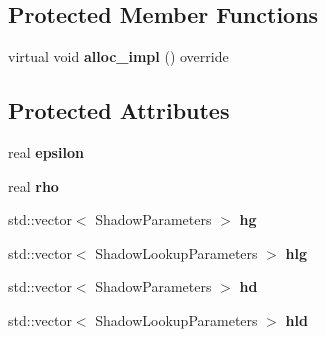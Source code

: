 \subsection*{Protected Member Functions}
\begin{DoxyCompactItemize}
\item 
\hypertarget{structdynet_1_1AdadeltaTrainer_a98d5d3abe044d455df1a0fb3c35fbf44}{}virtual void {\bfseries alloc\+\_\+impl} () override\label{structdynet_1_1AdadeltaTrainer_a98d5d3abe044d455df1a0fb3c35fbf44}

\end{DoxyCompactItemize}
\subsection*{Protected Attributes}
\begin{DoxyCompactItemize}
\item 
\hypertarget{structdynet_1_1AdadeltaTrainer_a65675903e5b9d77c7adde456d85d7b8c}{}real {\bfseries epsilon}\label{structdynet_1_1AdadeltaTrainer_a65675903e5b9d77c7adde456d85d7b8c}

\item 
\hypertarget{structdynet_1_1AdadeltaTrainer_a41208d6c68aa6478a661aac929b335e6}{}real {\bfseries rho}\label{structdynet_1_1AdadeltaTrainer_a41208d6c68aa6478a661aac929b335e6}

\item 
\hypertarget{structdynet_1_1AdadeltaTrainer_a51fb513277530881e6cbe16222adfff8}{}std\+::vector$<$ Shadow\+Parameters $>$ {\bfseries hg}\label{structdynet_1_1AdadeltaTrainer_a51fb513277530881e6cbe16222adfff8}

\item 
\hypertarget{structdynet_1_1AdadeltaTrainer_a3150eb1db93079ca53e470265c0a81df}{}std\+::vector$<$ Shadow\+Lookup\+Parameters $>$ {\bfseries hlg}\label{structdynet_1_1AdadeltaTrainer_a3150eb1db93079ca53e470265c0a81df}

\item 
\hypertarget{structdynet_1_1AdadeltaTrainer_a835052dcc3f77e01016afb8de0a9c4b0}{}std\+::vector$<$ Shadow\+Parameters $>$ {\bfseries hd}\label{structdynet_1_1AdadeltaTrainer_a835052dcc3f77e01016afb8de0a9c4b0}

\item 
\hypertarget{structdynet_1_1AdadeltaTrainer_a1dbae7cb54caba3e863f5a7c97934fe6}{}std\+::vector$<$ Shadow\+Lookup\+Parameters $>$ {\bfseries hld}\label{structdynet_1_1AdadeltaTrainer_a1dbae7cb54caba3e863f5a7c97934fe6}

\end{DoxyCompactItemize}
